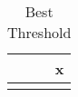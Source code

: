 \begin{table}[!h]
\centering
\caption{Best Threshold}
\centering
\begin{tabular}[t]{r}
\toprule
x\\
\midrule
\cellcolor{gray!10}{0.7}\\
\bottomrule
\end{tabular}
\end{table}
